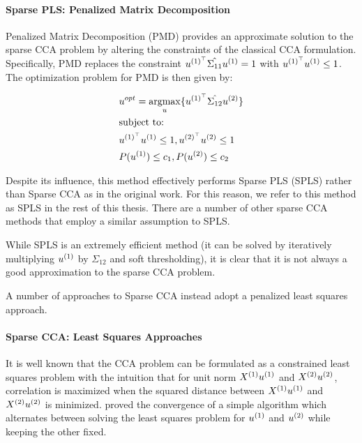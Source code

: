 \paragraph{Sparse PLS: Penalized Matrix Decomposition}
Penalized Matrix Decomposition (PMD) \cite{witten2009penalized} provides an approximate solution to the sparse CCA problem by altering the constraints of the classical CCA formulation.
Specifically, PMD replaces the constraint \(u^{(1)^{\top}} \hat{\Sigma_{11}} u^{(1)} = 1\) with \(u^{(1)^{\top}} u^{(1)} \leq 1\).
The optimization problem for PMD is then given by:

\begin{align}
    & u^{opt}=\underset{u}{\mathrm{argmax}}\{ u^{(1)^{\top}} \hat{\Sigma_{12}} u^{(2)} \} \\
    & \text{subject to:} \notag \\
    & u^{(1)^{\top}} u^{(1)} \leq 1 , u^{(2)^{\top}} u^{(2)} \leq 1 \notag \\
    & P(u^{(1)}) \leq c_1 , P(u^{(2)}) \leq c_2 \notag
\end{align}

Despite its influence, this method effectively performs Sparse PLS (SPLS) rather than Sparse CCA as in the original work.
For this reason, we refer to this method as SPLS in the rest of this thesis.
There are a number of other sparse CCA methods that employ a similar assumption to SPLS\cite{parkhomenko2009sparse, waaijenborg2008quantifying}.

While SPLS is an extremely efficient method (it can be solved by iteratively multiplying $u^{(1)}$ by $\hat{\Sigma_{12}}$ and soft thresholding), it is clear that it is not always a good approximation to the sparse CCA problem.

A number of approaches to Sparse CCA instead adopt a penalized least squares approach.

\paragraph{Sparse CCA: Least Squares Approaches}

It is well known that the CCA problem can be formulated as a constrained least squares problem with the intuition that
for unit norm \(X^{(1)} u^{(1)}\) and \(X^{(2)} u^{(2)}\), correlation is maximized when the squared distance
between \(X^{(1)} u^{(1)}\) and \(X^{(2)} u^{(2)}\) is minimized. \cite{golub1995canonical} proved the
convergence of a simple algorithm which alternates between solving the least squares problem for \(u^{(1)}\) and
\(u^{(2)}\) while keeping the other fixed.

